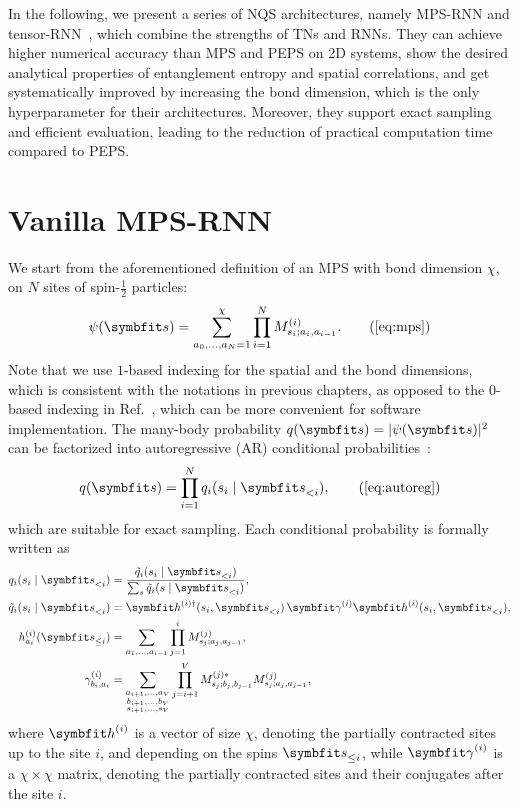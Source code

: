 In the following, we present a series of NQS architectures, namely MPS-RNN and tensor-RNN~\cite{wu2023tensor}, which combine the strengths of TNs and RNNs. They can achieve higher numerical accuracy than MPS and PEPS on 2D systems, show the desired analytical properties of entanglement entropy and spatial correlations, and get systematically improved by increasing the bond dimension, which is the only hyperparameter for their architectures. Moreover, they support exact sampling and efficient evaluation, leading to the reduction of practical computation time compared to PEPS.

\section{Vanilla MPS-RNN}

We start from the aforementioned definition of an MPS with bond dimension $\chi$, on $N$ sites of spin-$\frac{1}{2}$ particles:
\begin{equation}
\psi(\vs) = \sum_{a_0, \ldots, a_N = 1}^\chi \prod_{i = 1}^N M^{(i)}_{s_i; a_i, a_{i - 1}}.
\tag{\ref{eq:mps}}
\end{equation}
Note that we use $1$-based indexing for the spatial and the bond dimensions, which is consistent with the notations in previous chapters, as opposed to the $0$-based indexing in Ref.~\cite{wu2023tensor}, which can be more convenient for software implementation. The many-body probability $q(\vs) = |\psi(\vs)|^2$ can be factorized into autoregressive (AR) conditional probabilities~\cite{ferris2012perfect, han2018unsupervised, wei2022sequential}:
\begin{equation}
q(\vs) = \prod_{i = 1}^N q_i(s_i \mid \vs_{< i}),
\tag{\ref{eq:autoreg}}
\end{equation}
which are suitable for exact sampling. Each conditional probability is formally written as
\begin{align}
q_i(s_i \mid \vs_{< i}) &=
\frac{\tilde{q}_i(s_i \mid \vs_{< i})}{\sum_s \tilde{q}_i(s \mid \vs_{< i})}, \\
\tilde{q}_i(s_i \mid \vs_{< i}) &=
\vh^{(i) \dagger}(s_i, \vs_{< i})\,\mga^{(i)} \vh^{(i)}(s_i, \vs_{< i}), \label{eq:mps-cond-prob} \\
h^{(i)}_{a_i}(\vs_{\le i}) &=
\sum_{a_1, \ldots, a_{i - 1}}
\prod_{j = 1}^i M^{(j)}_{s_j; a_j, a_{j - 1}}, \\
\gamma^{(i)}_{b_i, a_i} &=
\sum_{\substack{a_{i + 1}, \ldots, a_V \\ b_{i + 1}, \ldots, b_V \\ s_{i + 1}, \ldots, s_V}}
\prod_{j = i + 1}^V M^{(j) *}_{s_j; b_j, b_{j - 1}} M^{(j)}_{s_j; a_j, a_{j - 1}}, \label{eq:mps-gamma}
\end{align}
where $\vh^{(i)}$ is a vector of size $\chi$, denoting the partially contracted sites up to the site $i$, and depending on the spins $\vs_{\le i}$, while $\mga^{(i)}$ is a $\chi \times \chi$ matrix, denoting the partially contracted sites and their conjugates after the site $i$.

